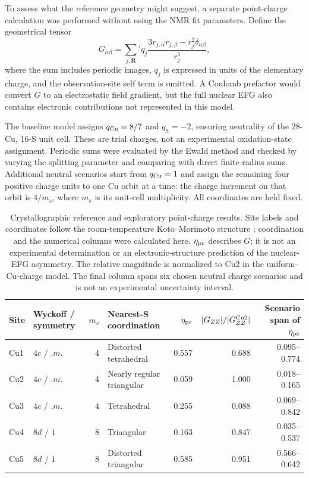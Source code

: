 To assess what the reference geometry might suggest, a separate point-charge calculation was performed without using the NMR fit parameters. Define the geometrical tensor
\begin{equation}
G_{\alpha\beta}
=\sum_{j,\bm R}'q_j
\frac{3r_{j,\alpha}r_{j,\beta}
-r_j^2\delta_{\alpha\beta}}{r_j^5},
\label{eq:pointcharge}
\end{equation}
where the sum includes periodic images, $q_j$ is expressed in units of the elementary charge, and the observation-site self term is omitted. A Coulomb prefactor would convert $G$ to an electrostatic field gradient, but the full nuclear EFG also contains electronic contributions not represented in this model.

The baseline model assigns $q_{\mathrm{Cu}}=8/7$ and $q_{\mathrm S}=-2$, ensuring neutrality of the 28-Cu, 16-S unit cell. These are trial charges, not an experimental oxidation-state assignment. Periodic sums were evaluated by the Ewald method and checked by varying the splitting parameter and comparing with direct finite-radius sums. Additional neutral scenarios start from $q_{\mathrm{Cu}}=1$ and assign the remaining four positive charge units to one Cu orbit at a time: the charge increment on that orbit is $4/m_s$, where $m_s$ is its unit-cell multiplicity. All coordinates are held fixed.

\begin{table}[t]
\centering
\small
\setlength{\tabcolsep}{4pt}
\caption{Crystallographic reference and exploratory point-charge results. Site labels and coordinates follow the room-temperature Koto--Morimoto structure \citep{Koto1970}; coordination and the numerical columns were calculated here. $\eta_{\rm pc}$ describes $G$; it is not an experimental determination or an electronic-structure prediction of the nuclear-EFG asymmetry. The relative magnitude is normalized to Cu2 in the uniform-Cu-charge model. The final column spans six chosen neutral charge scenarios and is not an experimental uncertainty interval.}
\label{tab:structural}
\begin{tabular}{llrlrrr}
\toprule
Site & Wyckoff / symmetry & $m_s$ & Nearest-S coordination
& $\eta_{\rm pc}$ & $|G_{ZZ}|/|G_{ZZ}^{\mathrm{Cu}2}|$
& Scenario span of $\eta_{\rm pc}$ \\
\midrule
Cu1 & $4c$ / $.m.$ & 4 & Distorted tetrahedral & 0.557 & 0.688 & 0.095--0.774 \\
Cu2 & $4c$ / $.m.$ & 4 & Nearly regular triangular & 0.059 & 1.000 & 0.018--0.165 \\
Cu3 & $4c$ / $.m.$ & 4 & Tetrahedral & 0.255 & 0.088 & 0.069--0.842 \\
Cu4 & $8d$ / $1$ & 8 & Triangular & 0.163 & 0.847 & 0.035--0.537 \\
Cu5 & $8d$ / $1$ & 8 & Distorted triangular & 0.585 & 0.951 & 0.566--0.642 \\
\bottomrule
\end{tabular}
\end{table}

